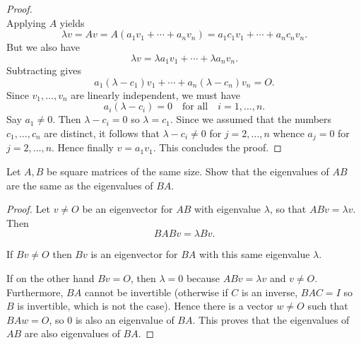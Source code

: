 {{\begin{Solution}
\begin{proof}
\begin{equation*}
            \end{equation*}
            Applying $A$ yields 
            \begin{equation*}
                \lambda v = Av = A(a_1v_1 + \cdots + a_nv_n) = a_1c_1v_1 + \cdots + a_nc_nv_n. 
            \end{equation*}
            But we also have 
            \begin{equation*}
                \lambda v = \lambda a_1 v_1 + \cdots + \lambda a_n v_n. 
            \end{equation*}
            Subtracting gives 
            \begin{equation*}
                a_1(\lambda - c_1)v_1 + \cdots + a_n(\lambda - c_n)v_n = O. 
            \end{equation*}
            Since $v_1, \dots, v_n$ are linearly independent, we must have 
            \begin{equation*}
                a_i (\lambda - c_i) = 0 \quad \text{for all} \quad i = 1, \dots, n. 
            \end{equation*}
            Say $a_1 \neq 0$. 
            Then $\lambda - c_i = 0$ so $\lambda = c_1$. 
            Since we assumed that the numbers $c_1, \dots, c_n$ are distinct, it follows that $\lambda - c_i \neq 0$ for $j = 2, \dots, n$ whence $a_j = 0$ for $j = 2, \dots, n$. 
            Hence finally $v = a_1v_1$. 
            This concludes the proof. 
        \end{proof}
    \end{Solution}
    \item 
    Let $A, B$ be square matrices of the same size. 
    Show that the eigenvalues of $AB$ are the same as the eigenvalues of $BA$. 
    \begin{Solution}
        \begin{proof}
            Let $v \neq O$ be an eigenvector for $AB$ with eigenvalue $\lambda$, so that $ABv = \lambda v$. 
            Then 
            \begin{equation*}
                BABv = \lambda Bv. 
            \end{equation*}

            If $Bv \neq O$ then $Bv$ is an eigenvector for $BA$ with this same eigenvalue $\lambda$. 

            If on the other hand $Bv = O$, then $\lambda = 0$ because $ABv = \lambda v$ and $v \neq O$. 
            Furthermore, $BA$ cannot be invertible (otherwise if $C$ is an inverse, $BAC = I$ so $B$ is invertible, which is not the case). 
            Hence there is a vector $w \neq O$ such that $BAw = O$, so $0$ is also an eigenvalue of $BA$. 
            This proves that the eigenvalues of $AB$ are also eigenvalues of $BA$. 


\end{proof}
\end{Solution}}}
